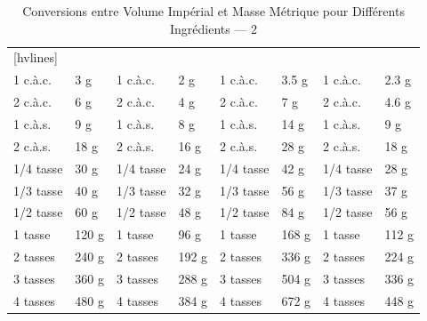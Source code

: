 \begin{table}
	\centering
	\caption{Conversions entre Volume Impérial et Masse Métrique pour Différents Ingrédients --- 2}
	\def\arraystretch{2}
	\begin{NiceTabular}{*{8}{m{.1\textwidth}}}[hvlines]
		 &       &  &       &  &       &          \\
		1 c.à.c.                               & 3 g   & 1 c.à.c.                                & 2 g   & 1 c.à.c.                        & 3.5 g & 1 c.à.c.                                    & 2.3 g \\
		2 c.à.c.                               & 6 g   & 2 c.à.c.                                & 4 g   & 2 c.à.c.                        & 7 g   & 2 c.à.c.                                    & 4.6 g \\
		1 c.à.s.                               & 9 g   & 1 c.à.s.                                & 8 g   & 1 c.à.s.                        & 14 g  & 1 c.à.s.                                    & 9 g   \\
		2 c.à.s.                               & 18 g  & 2 c.à.s.                                & 16 g  & 2 c.à.s.                        & 28 g  & 2 c.à.s.                                    & 18 g  \\
		1/4 tasse                              & 30 g  & 1/4 tasse                               & 24 g  & 1/4 tasse                       & 42 g  & 1/4 tasse                                   & 28 g  \\
		1/3 tasse                              & 40 g  & 1/3 tasse                               & 32 g  & 1/3 tasse                       & 56 g  & 1/3 tasse                                   & 37 g  \\
		1/2 tasse                              & 60 g  & 1/2 tasse                               & 48 g  & 1/2 tasse                       & 84 g  & 1/2 tasse                                   & 56 g  \\
		1 tasse                                & 120 g & 1 tasse                                 & 96 g  & 1 tasse                         & 168 g & 1 tasse                                     & 112 g \\
		2 tasses                               & 240 g & 2 tasses                                & 192 g & 2 tasses                        & 336 g & 2 tasses                                    & 224 g \\
		3 tasses                               & 360 g & 3 tasses                                & 288 g & 3 tasses                        & 504 g & 3 tasses                                    & 336 g \\
		4 tasses                               & 480 g & 4 tasses                                & 384 g & 4 tasses                        & 672 g & 4 tasses                                    & 448 g \\
	\end{NiceTabular}
\end{table}


